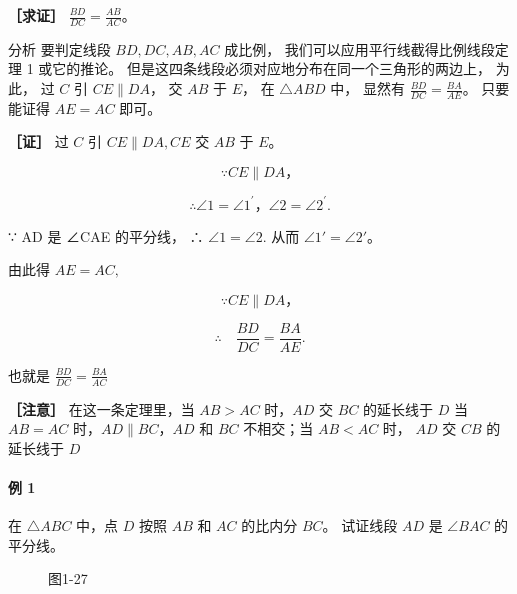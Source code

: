 \textbf{［求证］} \(\frac{BD}{DC} = \frac{AB}{AC}\)。

分析 要判定线段 \(BD, DC, AB, AC\) 成比例，
我们可以应用平行线截得比例线段定理 1 或它的推论。
但是这四条线段必须对应地分布在同一个三角形的两边上， 为此， 过 \(C\) 引
\(CE \parallel DA\)， 交 \(AB\) 于 \(E\)， 在 \(\triangle ABD\) 中，
显然有 \(\frac{BD}{DC} = \frac{BA}{AE}\)。 只要能证得 \(AE = AC\) 即可。

\textbf{［证］} 过 \(C\) 引 \(CE \parallel DA, CE\) 交 \(AB\) 于 \(E\)。

\[
\because C E \parallel D A\text{，}
\]

\[
\therefore \angle 1 = \angle 1 ^ {\prime}\text{，} \angle 2 = \angle 2 ^ {\prime}.
\]

∵ AD 是 ∠CAE 的平分线， ∴ \(\angle1=\angle2.\) 从而
\(\angle1'=\angle2'\)。

由此得 \(AE = AC,\)

\[
\because C E \parallel D A\text{，}
\]

\[
\therefore \quad \frac {B D}{D C} = \frac {B A}{A E}.
\]

也就是 \(\frac{BD}{DC} = \frac{BA}{AC}\)

\textbf{［注意］} 在这一条定理里，当 \(AB > AC\) 时，\(AD\) 交 \(BC\)
的延长线于 \(D\) 当 \(AB = AC\) 时，\(AD \parallel BC\)，\(AD\) 和
\(BC\) 不相交；当 \(AB < AC\) 时， \(AD\) 交 \(CB\) 的延长线于 \(D\)

\paragraph{例 1}

在 \(\triangle ABC\) 中，点 \(D\) 按照 \(AB\) 和 \(AC\) 的比内分
\(BC\)。 试证线段 \(AD\) 是 \(\angle BAC\) 的平分线。

\begin{figure}
\centering
{}
\caption{图1-27}
\end{figure}

